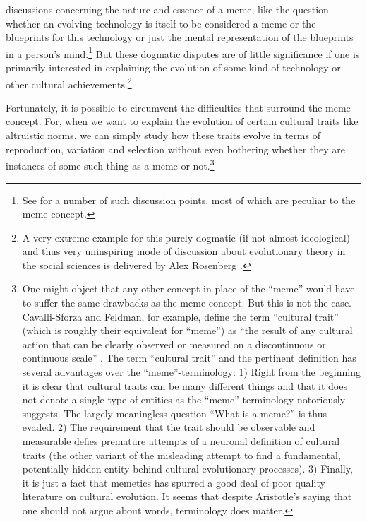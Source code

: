 discussions concerning the nature and essence of a meme, like the
question whether an evolving technology is itself to be considered a
meme or the blueprints for this technology or just the mental
representation of the blueprints in a person's mind.\footnote{See
  \cite[p.\ 164ff.]{salwiczek:2001} for a number of such discussion
  points, most of which are peculiar to the meme concept.} But these
dogmatic disputes are of little significance if one is primarily
interested in explaining the evolution of some kind of technology or
other cultural achievements.\footnote{A very extreme example for this
  purely dogmatic (if not almost ideological) and thus very
  uninspiring mode of discussion about evolutionary theory in the
  social sciences is delivered by Alex Rosenberg
  \cite[]{rosenberg:2005}.}

Fortunately, it is possible to circumvent the difficulties that surround the
meme concept. For, when we want to explain the evolution of certain cultural
traits like altruistic norms, we can simply study how these traits evolve in
terms of reproduction, variation and selection without even bothering whether
they are instances of some such thing as a meme or not.\footnote{One might
  object that any other concept in place of the ``meme'' would have to suffer
  the same drawbacks as the meme-concept. But this is not the case.
  Cavalli-Sforza and Feldman, for example, define the term ``cultural trait''
  (which is roughly their equivalent for ``meme'') as ``the result of any
  cultural action that can be clearly observed or measured on a discontinuous
  or continuous scale'' \cite[p.\ 73]{cavalli-sforza-feldman:1981}. The term
  ``cultural trait'' and the pertinent definition has several advantages
  over the ``meme''-terminology: 1) Right from the beginning it is clear that
  cultural traits can be many different things and that it does not denote a
  single type of entities as the ``meme''-terminology notoriously suggests.
  The largely meaningless question ``What is a meme?'' is thus evaded. 2) The
  requirement that the trait should be observable and measurable defies
  premature attempts of a neuronal definition of cultural traits (the other
  variant of the misleading attempt to find a fundamental, potentially hidden
  entity behind cultural evolutionary processes). 3) Finally, it is just a
  fact that memetics has spurred a good deal of poor quality literature on
  cultural evolution. It seems that despite Aristotle's saying that one should
  not argue about words, terminology does matter.}

